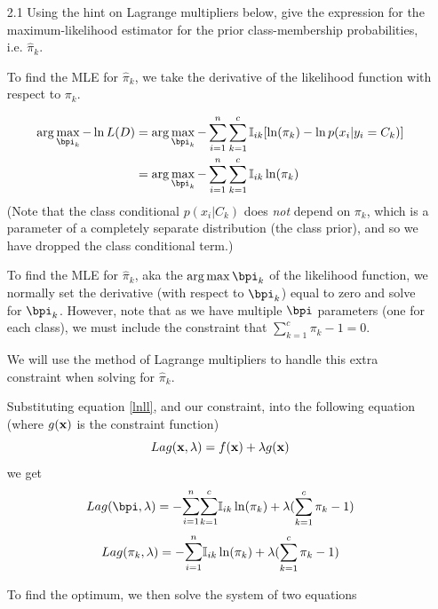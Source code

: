\documentclass[submit]{harvardml}
\newenvironment{answer}{%
    \color{answergreen}\bf}
  {%
  }
\begin{document}
\begin{enumerate}
    \item[2.1]  Using the hint on Lagrange multipliers below, give the
    expression for the maximum-likelihood estimator for the prior
    class-membership probabilities, i.e.  $\hat \pi_k.$

    \begin{answer}

        To find the MLE for $\hat \pi_k$, we take the derivative of the
        likelihood function with respect to $\pi_k$. 
        
        \begin{align}
            \arg\max_{\bpi_k} 
            -\ln L(D) 
            &= \arg\max_{\bpi_k} 
                 - \sum_{i=1}^n \sum_{k=1}^c \mBI [
                    \ln(\pi_k) - \ln p(x_i| y_i = C_k) ]\\
            &= \arg\max_{\bpi_k} 
                 - \sum_{i=1}^n \sum_{k=1}^c \mBI 
                    \ln(\pi_k) \label{lnll}
        \end{align}
        (Note that the class conditional $p(x_i | C_k)$ does \textit{not} depend on
        $\pi_k$, which is a parameter of a completely separate distribution (the
        class prior), and so we have dropped the class conditional term.)

        To find the MLE for $\hat \pi_k$, aka the $\arg\max{\bpi_k}$ of the
        likelihood function, we normally set the derivative (with respect to
        $\bpi_k$) equal to zero and solve for $\bpi_k$. However, note
        that as we have multiple $\bpi$ parameters (one for each class), we must
        include the constraint that $\sum_{k=1}^c \pi_k-1=0$.

        We will use the method of Lagrange multipliers to handle this extra
        constraint when solving for $\hat \pi_k$.
            
        Substituting equation \eqref{lnll}, and our constraint, into the
        following equation (where $g(\mathbf{x})$ is the constraint function)
        $$
        Lag(\mathbf{x},\lambda) = f(\mathbf{x})+\lambda g(\mathbf{x}) \\
        $$
        we get
        $$
        Lag(\bpi,\lambda) 
            = - \lsum_{i=1}^n \lsum_{k=1}^c \mBI \ln(\pi_k) + \lambda( \sum_{k=1}^c\pi_k-1)
        $$
        $$
        Lag(\pi_k,\lambda) 
            = - \lsum_{i=1}^n \mBI \ln(\pi_k) + \lambda( \sum_{k=1}^c\pi_k-1)
            $$

        To find the optimum, we then solve the system of two equations  


\end{answer}
\end{enumerate}
\end{document}
